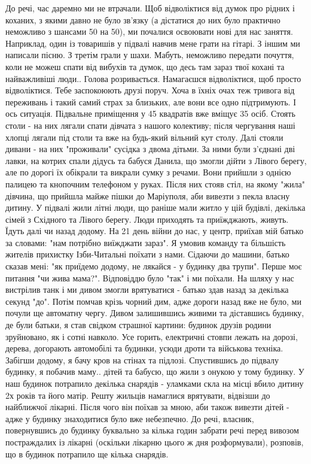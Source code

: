 До речі, час даремно ми не втрачали. Щоб відволіктися від думок про рідних і коханих, з якими давно не було зв'язку (а дістатися до них було практично неможливо з шансами 50 на 50), ми почалися освоювати нові для нас заняття. Наприклад, один із товаришів у підвалі навчив мене грати на гітарі. З іншим ми написали пісню. З третім грали у шахи. 
Мабуть, неможливо передати почуття, коли не можеш спати від вибухів та думок, що десь там зараз твої кохані та найважливіші люди.. Голова розривається. Намагаєшся відволіктися, щоб просто відволіктися. Тебе заспокоюють друзі поруч. Хоча в їхніх очах теж тривога від переживань і такий самий страх за близьких, але вони все одно підтримують.
І ось ситуація. Підвальне приміщення у 45 квадратів вже вміщує 35 осіб. Стоять столи - на них лягали спати дівчата з нашого колективу; після чергування наші хлопці лягали під столи та вже на будь-який вільний кут столу. Далі стояли дивани - на них "проживали" сусідка з двома дітьми. За ними були з'єднані дві лавки, на котрих спали дідусь та бабуся Данила, що змогли дійти з Лівого берегу, але по дорогі їх обікрали та викрали сумку з речами. Вони прийшли з однією палицею та кнопочним телефоном у руках. Після них стояв стіл, на якому "жила" дівчина, що прийшла майже пішки до Маріуполя, аби вивезти з пекла власну дитину. У підвалі жили літні люди, що раніше мали житло у цій будівлі, декілька сімей з Східного та Лівого берегу. Люди приходять та приїжджають, живуть. Їдуть далі чи назад додому.  
На 21 день війни до нас, у центр, приїхав мій батько за словами: "нам потрібно виїжджати зараз". Я умовив команду та більшість жителів прихистку Ізби-Читальні поїхати з нами. Сідаючи до машини, батько сказав мені: "як приїдемо додому, не лякайся - у будинку два трупи". Перше моє питання "чи жива мама?". Відповіддю було "так" і ми поїхали. На шляху у нас вистрілив танк і ми дивом змогли врятуватися - батько здав назад за декілька секунд "до". Потім помчав крізь чорний дим, адже дороги назад вже не було, ми почули ще автоматну чергу. Дивом залишившись живими та діставшись будинку, де були батьки, я став свідком страшної картини: будинок друзів родини зруйновано, як і сотні навколо. Усе горить, електричні стовпи лежать на дорозі, дерева, догорають автомобілі та будинки, усюди дроти та військова техніка. Забігши додому, я бачу кров на стінах та підлозі. Спустившись до підвалу будинку, я побачив маму..
дітей та бабусю, що жили з онукою у тому будинку. 
У наш будинок потрапило декілька снарядів - уламками скла на місці вбило дитину 2х років та його матір. Решту жильців намаглися врятувати, відвізши до найближчої лікарні. Після чого він поїхав за мною, аби також вивезти дітей - адже у будинку знаходитися було вже небезпечно. До речі, власник, повернувшись до будинку буквально за кілька годин забрати речі перед вивозом постраждалих із лікарні (оскільки лікарню цього ж дня розформували), розповів, що в будинок  потрапило ще кілька снарядів. 
